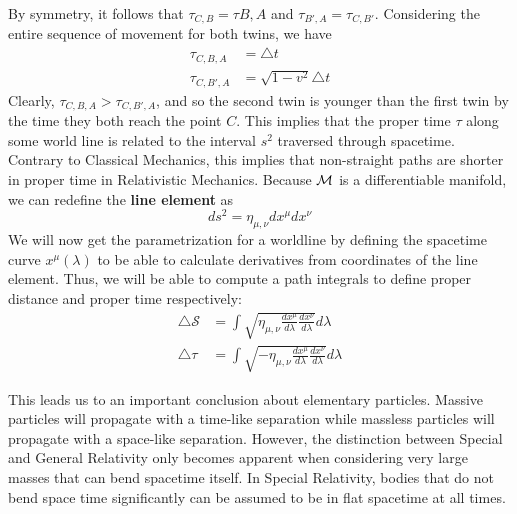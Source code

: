 \documentclass{article}
\begin{document}
		By symmetry, it follows that $\tau_{C,B} = \tau{B,A}$ and $\tau_{B', A} = \tau_{C, B'}$. Considering the entire sequence of movement for both twins, we have
		\begin{align*}
			\tau_{C,B,A} &= \triangle t \\
			\tau_{C,B',A} &= \sqrt{1 - v^2} \triangle t
 		\end{align*}
 		Clearly, $\tau_{C,B,A} > \tau_{C,B',A}$, and so the second twin is younger than the first twin by the time they both reach the point $C$. This implies that the proper time $\tau$ along some world line is related to the interval $s^2$ traversed through spacetime. Contrary to Classical Mechanics, this implies that non-straight paths are shorter in proper time in Relativistic Mechanics. Because $\mathcal{M}$ is a differentiable manifold, we can redefine the \textbf{line element} as
 		\begin{equation}
 			\label{eq:LineElement}
 			 \boxed{ds^2  = \eta_{\mu, \nu} dx^\mu dx^\nu}
 		\end{equation}
 		We will now get the parametrization for a worldline by defining the spacetime curve $x^\mu (\lambda)$ to be able to calculate derivatives from coordinates of the line element. Thus, we will be able to compute a path integrals to define proper distance and proper time respectively:
 		\begin{align*}
 			\triangle \mathcal{S} &= \int \sqrt{ \eta_{\mu, \nu} \frac{dx^\mu}{d\lambda} \frac{dx^\nu}{d\lambda}} d\lambda \\
 			\triangle \tau &= \int \sqrt{- \eta_{\mu, \nu} \frac{dx^\mu}{d\lambda} \frac{dx^\nu}{d\lambda}} d\lambda
 		\end{align*}
 		
 		This leads us to an important conclusion about elementary particles. Massive particles will propagate with a time-like separation while massless particles will propagate with a space-like separation. However, the distinction between Special and General Relativity only becomes apparent when considering very large masses that can bend spacetime itself. In Special Relativity, bodies that do not bend space time significantly can be assumed to be in flat spacetime at all times.
\end{document}
